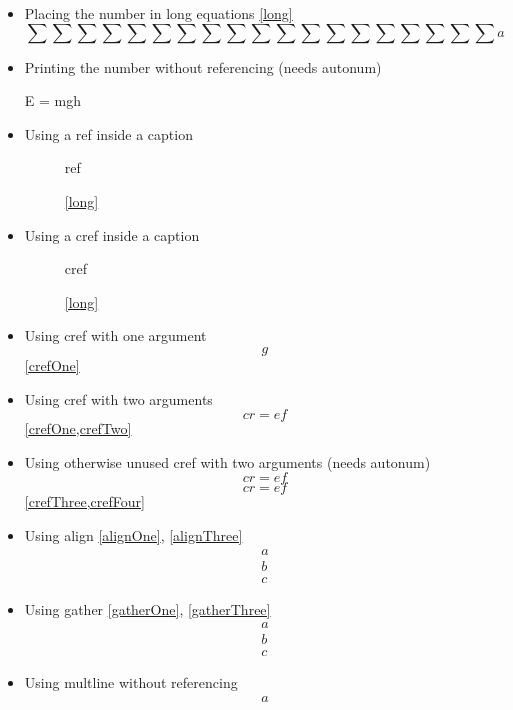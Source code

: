 \documentclass{article}
\begin{document}
\begin{itemize}
		\item Placing the number in long equations \ref{long}
			\begin{equation}\label{long}
				\sum\sum\sum\sum\sum\sum\sum\sum\sum\sum\sum\sum\sum\sum\sum\sum\sum\sum\sum a
			\end{equation}
		\item Printing the number without referencing (needs autonum)
			\begin{equation+}
				E = mgh
			\end{equation+}
		\item Using a ref inside a caption
			\begin{figure}
				ref
				\caption{\ref{long}}
			\end{figure}
		\item Using a cref inside a caption
			\begin{figure}
				cref
				\caption{\cref{long}}
			\end{figure}
		\item Using cref with one argument
			\begin{equation}\label{crefOne}
				g
			\end{equation}
			\cref{crefOne}
		\item Using cref with two arguments
			\begin{equation}\label{crefTwo}
				cr = ef
			\end{equation}
			\cref{crefOne,crefTwo}
		\item Using otherwise unused cref with two arguments (needs autonum)
			\[\label{crefThree}
				cr = ef
			\]
			\[\label{crefFour}
				cr = ef
			\]
			\cref{crefThree,crefFour}
		\item Using align \ref{alignOne}, \ref{alignThree}
			\begin{align}
				a\label{alignOne}\\
				b\label{alignTwo}\\
				c\label{alignThree}
			\end{align}
		\item Using gather \ref{gatherOne}, \ref{gatherThree}
			\begin{gather}
				a\label{gatherOne}\\
				b\label{gatherTwo}\\
				c\label{gatherThree}
			\end{gather}
		\item Using multline without referencing
			\begin{multline}
				a\\

\end{multline}
\end{itemize}
\end{document}

